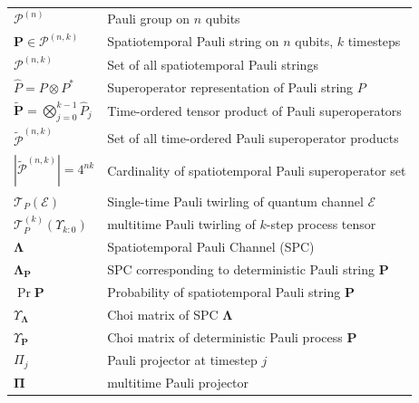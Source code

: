 \begin{table}[H]
\begin{tabular}{ll}
\(\mathcal{P}^{(n)}\) & Pauli group on \(n\) qubits \\
\(\mathbf{P} \in \mathcal{P}^{(n,k)}\) & Spatiotemporal Pauli string on \(n\) qubits, \(k\) timesteps  \\
\(\mathcal{P}^{(n,k)}\) & Set of all spatiotemporal Pauli strings  \\
\(\hat{P} = P \otimes P^*\) & Superoperator representation of Pauli string \(P\)  \\
\(\tilde{\mathbf{P}} = \bigotimes_{j=0}^{k-1} \hat{P}_j\) & Time-ordered tensor product of Pauli superoperators  \\
\(\tilde{\mathcal{P}}^{(n,k)}\) & Set of all time-ordered Pauli superoperator products  \\
\(|\tilde{\mathcal{P}}^{(n,k)}| = 4^{nk}\) & Cardinality of spatiotemporal Pauli superoperator set  \\
\(\mathcal{T}_P(\mathcal{E})\) & Single-time Pauli twirling of quantum channel \(\mathcal{E}\)  \\
\(\mathcal{T}^{(k)}_P(\Upsilon_{k:0})\) & multitime Pauli twirling of \(k\)-step process tensor  \\ %
\(\mathbf{\Lambda}\) & Spatiotemporal Pauli Channel (SPC)  \\
\(\mathbf{\Lambda}_{\mathbf{P}}\) & SPC corresponding to deterministic Pauli string \(\mathbf{P}\)  \\
\(\Pr{\mathbf{P}}\) & Probability of spatiotemporal Pauli string \(\mathbf{P}\)  \\
\(\Upsilon_{\bm{\Lambda}}\) & Choi matrix of SPC \(\mathbf{\Lambda}\)  \\
\(\Upsilon_{\mathbf{P}}\) & Choi matrix of deterministic Pauli process \(\mathbf{P}\)  \\
\(\Pi_j\) & Pauli projector at timestep \(j\)  \\
\(\mathbf{\Pi}\) & multitime Pauli projector  \\
\hline
\end{tabular}
\label{tab:spc-notation}
\end{table}

